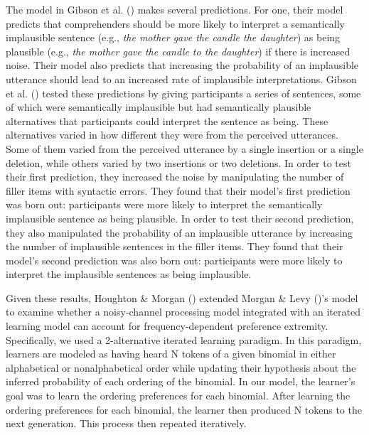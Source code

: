 \documentclass[
  12pt,
]{scrartcl}
\begin{document}
The model in Gibson et al.
()
makes several predictions. For one, their model predicts that
comprehenders should be more likely to interpret a semantically
implausible sentence (e.g., \emph{the mother gave the candle the
daughter}) as being plausible (e.g., \emph{the mother gave the candle to
the daughter}) if there is increased noise. Their model also predicts
that increasing the probability of an implausible utterance should lead
to an increased rate of implausible interpretations. Gibson et al.
()
tested these predictions by giving participants a series of sentences,
some of which were semantically implausible but had semantically
plausible alternatives that participants could interpret the sentence as
being. These alternatives varied in how different they were from the
perceived utterances. Some of them varied from the perceived utterance
by a single insertion or a single deletion, while others varied by two
insertions or two deletions. In order to test their first prediction,
they increased the noise by manipulating the number of filler items with
syntactic errors. They found that their model's first prediction was
born out: participants were more likely to interpret the semantically
implausible sentence as being plausible. In order to test their second
prediction, they also manipulated the probability of an implausible
utterance by increasing the number of implausible sentences in the
filler items. They found that their model's second prediction was also
born out: participants were more likely to interpret the implausible
sentences as being implausible.

Given these results, Houghton \& Morgan
()
extended Morgan \& Levy
()'s
model to examine whether a noisy-channel processing model integrated
with an iterated learning model can account for frequency-dependent
preference extremity. Specifically, we used a 2-alternative iterated
learning paradigm. In this paradigm, learners are modeled as having
heard N tokens of a given binomial in either alphabetical or
nonalphabetical order while updating their hypothesis about the inferred
probability of each ordering of the binomial. In our model, the
learner's goal was to learn the ordering preferences for each binomial.
After learning the ordering preferences for each binomial, the learner
then produced N tokens to the next generation. This process then
repeated iteratively.
\end{document}
